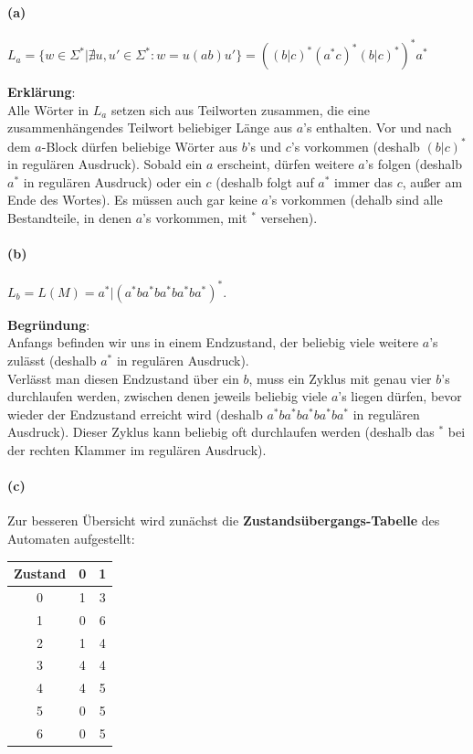 \paragraph{(a)}
	$L_a = \{w \in \Sigma^* | \nexists u,u' \in \Sigma^*: w =u(ab)u'\} = ((b|c)^*(a^*c)^*(b|c)^*)^*a^*$
	
	\textbf{Erklärung}: \\
	Alle Wörter in $L_a$ setzen sich aus Teilworten zusammen, die eine zusammenhängendes Teilwort beliebiger Länge aus $a$'s enthalten. Vor und nach dem $a$-Block dürfen beliebige Wörter aus $b$'s und $c$'s vorkommen (deshalb $(b|c)^*$ in regulären Ausdruck). Sobald ein $a$ erscheint, dürfen weitere $a$'s folgen (deshalb $a^*$ in regulären Ausdruck) oder ein $c$ (deshalb folgt auf $a^*$ immer das $c$, außer am Ende des Wortes). Es müssen auch gar keine $a$'s vorkommen (dehalb sind alle Bestandteile, in denen $a$'s vorkommen, mit $^*$ versehen).

\paragraph{(b)}
	$L_b = L(M) = a^*|(a^* ba^* ba^* ba^* ba^*)^*$.
	
	\textbf{Begründung}: \\
	Anfangs befinden wir uns in einem Endzustand, der beliebig viele weitere $a$'s zulässt (deshalb $a^*$ in regulären Ausdruck).\\
	Verlässt man diesen Endzustand über ein $b$, muss ein Zyklus mit genau vier $b$'s durchlaufen werden, zwischen denen jeweils beliebig viele $a$'s liegen dürfen, bevor wieder der Endzustand erreicht wird (deshalb $a^* ba^* ba^* ba^* ba^*$ in regulären Ausdruck). Dieser Zyklus kann beliebig oft durchlaufen werden (deshalb das $^*$ bei der rechten Klammer im regulären Ausdruck).
	
\paragraph{(c)}
	Zur besseren Übersicht wird zunächst die \textbf{Zustandsübergangs-Tabelle} des Automaten aufgestellt:\\
	\begin{tabular}{|c|c|c|}
		\hline
		\textbf{Zustand} & \textbf{0} & \textbf{1} \\
		\hline
		0                & 1          & 3 \\
		\hline
		1                & 0          & 6 \\
		\hline
		2                & 1          & 4 \\
		\hline
		3                & 4          & 4 \\
		\hline
		4                & 4          & 5 \\
		\hline
		5                & 0          & 5 \\
		\hline
		6                & 0          & 5 \\
		\hline
	\end{tabular} 
	
